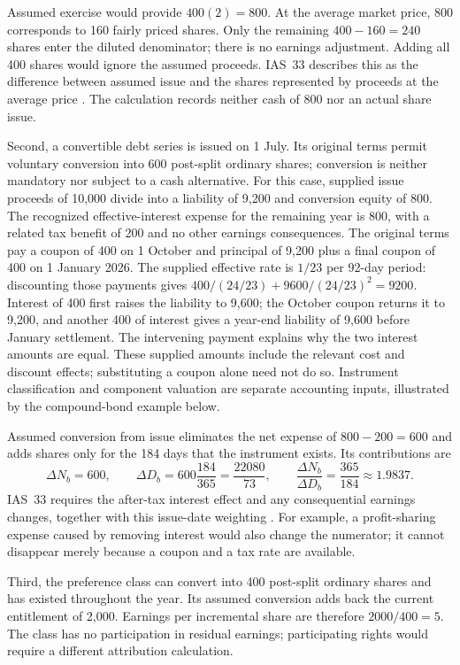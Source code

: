 Assumed exercise would provide $400(2)=800$. At the average market price,
800 corresponds to 160 fairly priced shares. Only the remaining
$400-160=240$ shares enter the diluted denominator; there is no earnings
adjustment. Adding all 400 shares would ignore the assumed proceeds.
IAS~33 describes this as the difference between assumed issue and the
shares represented by proceeds at the average price
\citep[IAS~33, paragraphs 45--47 and A4--A5]{eu20231803}.
The calculation records neither cash of 800 nor an actual share issue.

Second, a convertible debt series is issued on 1 July. Its original terms
permit voluntary conversion into 600 post-split ordinary shares; conversion
is neither mandatory nor subject to a cash alternative. For this case,
supplied issue proceeds of 10,000 divide into a liability of 9,200 and
conversion equity of 800. The recognized effective-interest expense for
the remaining year is 800, with a related tax benefit of 200 and no other
earnings consequences. The original terms pay a coupon of 400 on 1 October
and principal of 9,200 plus a final coupon of 400 on 1 January 2026.
The supplied effective rate is $1/23$ per 92-day period: discounting those
payments gives $400/(24/23)+9600/(24/23)^2=9200$.
Interest of 400 first raises the liability to 9,600; the October coupon
returns it to 9,200, and another 400 of interest gives a year-end liability
of 9,600 before January settlement. The intervening payment explains why
the two interest amounts are equal. These supplied amounts include the
relevant cost and discount effects; substituting a coupon alone need not do so.
Instrument classification and component valuation are separate accounting
inputs, illustrated by the compound-bond example below.

Assumed conversion from issue eliminates the net expense of
$800-200=600$ and adds shares only for the 184 days that the instrument
exists. Its contributions are
\[
 \Delta N_b=600,\qquad
 \Delta D_b=600\frac{184}{365}=\frac{22080}{73},
 \qquad
 \frac{\Delta N_b}{\Delta D_b}=\frac{365}{184}\approx1.9837.
\]
IAS~33 requires the after-tax interest effect and any consequential
earnings changes, together with this issue-date weighting
\citep[IAS~33, paragraphs 33--39, 49--50]{eu20231803}.
For example, a profit-sharing expense caused by removing interest would
also change the numerator; it cannot disappear merely because a coupon
and a tax rate are available.

Third, the preference class can convert into 400 post-split ordinary
shares and has existed throughout the year. Its assumed conversion adds
back the current entitlement of 2,000. Earnings per incremental share
are therefore $2000/400=5$. The class has no participation in residual
earnings; participating rights would require a different attribution
calculation.

